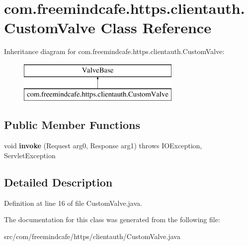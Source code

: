 \hypertarget{classcom_1_1freemindcafe_1_1https_1_1clientauth_1_1_custom_valve}{}\section{com.\+freemindcafe.\+https.\+clientauth.\+Custom\+Valve Class Reference}
\label{classcom_1_1freemindcafe_1_1https_1_1clientauth_1_1_custom_valve}
Inheritance diagram for com.\+freemindcafe.\+https.\+clientauth.\+Custom\+Valve\+:\begin{figure}[H]
\begin{center}
\leavevmode
\includegraphics[height=2.000000cm]{classcom_1_1freemindcafe_1_1https_1_1clientauth_1_1_custom_valve}
\end{center}
\end{figure}
\subsection*{Public Member Functions}
\begin{DoxyCompactItemize}
\item 
\hypertarget{classcom_1_1freemindcafe_1_1https_1_1clientauth_1_1_custom_valve_a353195a4a4406f08786b61a362958073}{}void {\bfseries invoke} (Request arg0, Response arg1)  throws I\+O\+Exception, 			\+Servlet\+Exception \label{classcom_1_1freemindcafe_1_1https_1_1clientauth_1_1_custom_valve_a353195a4a4406f08786b61a362958073}

\end{DoxyCompactItemize}


\subsection{Detailed Description}


Definition at line 16 of file Custom\+Valve.\+java.



The documentation for this class was generated from the following file\+:\begin{DoxyCompactItemize}
\item 
src/com/freemindcafe/https/clientauth/Custom\+Valve.\+java\end{DoxyCompactItemize}
